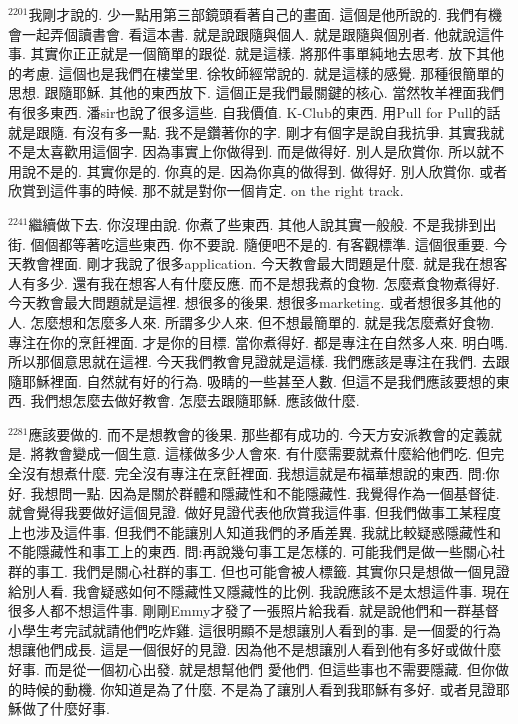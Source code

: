 \documentclass{book}
\begin{document}
$^{2201}$我剛才說的.
少一點用第三部鏡頭看著自己的畫面.
這個是他所說的.
我們有機會一起弄個讀書會.
看這本書.
就是說跟隨與個人.
就是跟隨與個別者.
他就說這件事.
其實你正正就是一個簡單的跟從.
就是這樣.
將那件事單純地去思考.
放下其他的考慮.
這個也是我們在樓堂里.
徐牧師經常說的.
就是這樣的感覺.
那種很簡單的思想.
跟隨耶穌.
其他的東西放下.
這個正是我們最關鍵的核心.
當然牧羊裡面我們有很多東西.
潘sir也說了很多這些.
自我價值.
K-Club的東西.
用Pull for Pull的話就是跟隨.
有沒有多一點.
我不是鑽著你的字.
剛才有個字是說自我抗爭.
其實我就不是太喜歡用這個字.
因為事實上你做得到.
而是做得好.
別人是欣賞你.
所以就不用說不是的.
其實你是的.
你真的是.
因為你真的做得到.
做得好.
別人欣賞你.
或者欣賞到這件事的時候.
那不就是對你一個肯定.
on the right track.

$^{2241}$繼續做下去.
你沒理由說.
你煮了些東西.
其他人說其實一般般.
不是我排到出街.
個個都等著吃這些東西.
你不要說.
隨便吧不是的.
有客觀標準.
這個很重要.
今天教會裡面.
剛才我說了很多application.
今天教會最大問題是什麼.
就是我在想客人有多少.
還有我在想客人有什麼反應.
而不是想我煮的食物.
怎麼煮食物煮得好.
今天教會最大問題就是這裡.
想很多的後果.
想很多marketing.
或者想很多其他的人.
怎麼想和怎麼多人來.
所謂多少人來.
但不想最簡單的.
就是我怎麼煮好食物.
專注在你的烹飪裡面.
才是你的目標.
當你煮得好.
都是專注在自然多人來.
明白嗎.
所以那個意思就在這裡.
今天我們教會見證就是這樣.
我們應該是專注在我們.
去跟隨耶穌裡面.
自然就有好的行為.
吸睛的一些甚至人數.
但這不是我們應該要想的東西.
我們想怎麼去做好教會.
怎麼去跟隨耶穌.
應該做什麼.

$^{2281}$應該要做的.
而不是想教會的後果.
那些都有成功的.
今天方安派教會的定義就是.
將教會變成一個生意.
這樣做多少人會來.
有什麼需要就煮什麼給他們吃.
但完全沒有想煮什麼.
完全沒有專注在烹飪裡面.
我想這就是布福華想說的東西.
問:你好.
我想問一點.
因為是關於群體和隱藏性和不能隱藏性.
我覺得作為一個基督徒.
就會覺得我要做好這個見證.
做好見證代表他欣賞我這件事.
但我們做事工某程度上也涉及這件事.
但我們不能讓別人知道我們的矛盾差異.
我就比較疑惑隱藏性和不能隱藏性和事工上的東西.
問:再說幾句事工是怎樣的.
可能我們是做一些關心社群的事工.
我們是關心社群的事工.
但也可能會被人標籤.
其實你只是想做一個見證給別人看.
我會疑惑如何不隱藏性又隱藏性的比例.
我說應該不是太想這件事.
現在很多人都不想這件事.
剛剛Emmy才發了一張照片給我看.
就是說他們和一群基督小學生考完試就請他們吃炸雞.
這很明顯不是想讓別人看到的事.
是一個愛的行為想讓他們成長.
這是一個很好的見證.
因為他不是想讓別人看到他有多好或做什麼好事.
而是從一個初心出發.
就是想幫他們 愛他們.
但這些事也不需要隱藏.
但你做的時候的動機.
你知道是為了什麼.
不是為了讓別人看到我耶穌有多好.
或者見證耶穌做了什麼好事.
\end{document}
